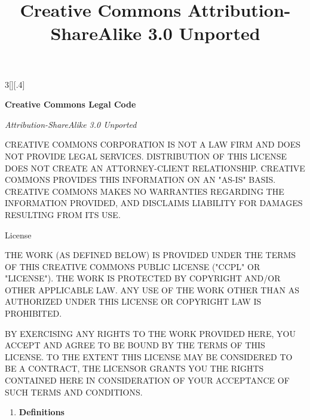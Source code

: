 \documentclass[8pt,a4paper]{article}
\title{Creative Commons Attribution-ShareAlike 3.0 Unported}
\begin{document}
%

\begin{multicols}{3}[][.4\paperwidth]%
 {%

  \textbf{Creative Commons Legal Code}
  \smallskip 

  \emph{Attribution-ShareAlike 3.0 Unported}
  \smallskip

  CREATIVE COMMONS CORPORATION IS NOT A LAW FIRM AND DOES NOT PROVIDE
  LEGAL SERVICES. DISTRIBUTION OF THIS LICENSE DOES NOT CREATE AN
  ATTORNEY-CLIENT RELATIONSHIP. CREATIVE COMMONS PROVIDES THIS
  INFORMATION ON AN "AS-IS" BASIS. CREATIVE COMMONS MAKES NO WARRANTIES
  REGARDING THE INFORMATION PROVIDED, AND DISCLAIMS LIABILITY FOR
  DAMAGES RESULTING FROM ITS USE.

 \medskip
  License
  \smallskip

  THE WORK (AS DEFINED BELOW) IS PROVIDED UNDER THE TERMS OF THIS CREATIVE
  COMMONS PUBLIC LICENSE ("CCPL" OR "LICENSE"). THE WORK IS PROTECTED BY
  COPYRIGHT AND/OR OTHER APPLICABLE LAW. ANY USE OF THE WORK OTHER THAN AS
  AUTHORIZED UNDER THIS LICENSE OR COPYRIGHT LAW IS PROHIBITED.

  BY EXERCISING ANY RIGHTS TO THE WORK PROVIDED HERE, YOU ACCEPT AND AGREE
  TO BE BOUND BY THE TERMS OF THIS LICENSE. TO THE EXTENT THIS LICENSE MAY
  BE CONSIDERED TO BE A CONTRACT, THE LICENSOR GRANTS YOU THE RIGHTS
  CONTAINED HERE IN CONSIDERATION OF YOUR ACCEPTANCE OF SUCH TERMS AND
  CONDITIONS.

}

\bigskip

\begin{enumerate}  

  \item \textbf{Definitions}

  \begin{enumerate}  


\end{enumerate}
\end{enumerate}
\end{multicols}
\end{document}
